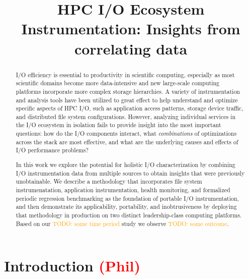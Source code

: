\documentclass[conference,10pt,compsocconf]{IEEEtran}
\newcommand{\assign}[1]{\textcolor{red}{(#1)}}
\newcommand{\todo}[1]{\textcolor{Orange}{TODO: #1}}
\begin{document}
\title{HPC I/O Ecosystem Instrumentation: Insights from correlating data}

\maketitle

\begin{abstract}

I/O efficiency is essential to productivity in scientific computing,
especially as most scientific domains become more data-intensive and
new large-scale computing platforms incorporate more complex storage
hierarchies.  A variety of instrumentation and analysis tools have been
utilized to great effect to help understand and optimize specific aspects of
HPC I/O, such as application access patterns, storage device traffic, and
distributed file system configurations.  However, analyzing individual services in the
I/O ecosystem in isolation fails to provide insight into the most important
questions: how do the I/O components interact, what \emph{combinations}
of optimizations across the stack are most effective, and what are the
underlying causes and effects of I/O performance problems?

In this work we explore the potential for holistic I/O characterization
by combining I/O instrumentation data from multiple sources to obtain
insights that were previously unobtainable. We describe a methodology that
incorporates file system instrumenatation, application instrumentation,
health monitoring, and formalized periodic regression benchmarking as
the foundation of portable I/O instrumentation, and then demonstrate
its applicability, portability, and inobtrusiveness by deploying that
methodology in production on two distinct leadership-class computing
platforms. Based on our \todo{some time period} study we observe
\todo{some outcome}.

\end{abstract}

\section{Introduction \assign{Phil}} \label{introduction}


\end{document}
